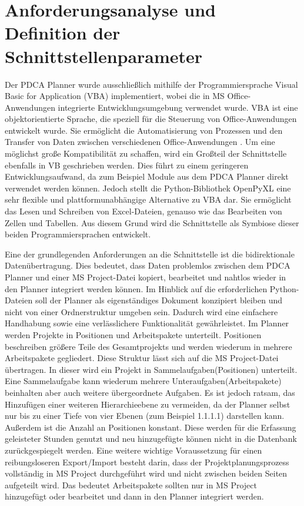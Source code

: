 \documentclass[11pt,a4paper]{report}
\begin{document}
\section{Anforderungsanalyse und Definition der Schnittstellenparameter}

Der PDCA Planner wurde ausschließlich mithilfe der Programmiersprache \glqq Visual Basic for Application \grqq{} (VBA) implementiert, wobei die in MS Office-Anwendungen integrierte  Entwicklungsumgebung verwendet wurde. VBA ist eine objektorientierte Sprache, die speziell für die Steuerung von Office-Anwendungen entwickelt wurde. Sie ermöglicht die Automatisierung von Prozessen und den Transfer von Daten zwischen verschiedenen Office-Anwendungen \cite{Kogan}. Um eine möglichst große Kompatibilität zu schaffen, wird ein Großteil der Schnittstelle ebenfalls in VB geschrieben werden. Dies führt zu  einem geringeren Entwicklungsaufwand, da zum Beispiel Module aus dem PDCA Planner direkt verwendet werden können. Jedoch stellt die Python-Bibliothek \glqq OpenPyXL \grqq{} eine sehr flexible und plattformunabhängige Alternative zu VBA dar. Sie ermöglicht das Lesen und Schreiben von Excel-Dateien, genauso wie das Bearbeiten von Zellen und Tabellen. Aus diesem Grund wird die Schnittstelle als Symbiose dieser beiden Programmiersprachen entwickelt.

\noindent
Eine der grundlegenden Anforderungen an die Schnittstelle ist die bidirektionale Datenübertragung. Dies bedeutet, dass Daten problemlos zwischen dem PDCA Planner und einer MS Project-Datei kopiert, bearbeitet und nahtlos wieder in den Planner integriert werden können. Im Hinblick auf die erforderlichen Python-Dateien soll der Planner als eigenständiges Dokument konzipiert bleiben und nicht von einer Ordnerstruktur umgeben sein. Dadurch wird eine einfachere Handhabung sowie eine verlässlichere Funktionalität gewährleistet. Im Planner werden Projekte in Positionen und Arbeitspakete unterteilt. Positionen beschreiben größere Teile des Gesamtprojekts und werden wiederum in mehrere Arbeitspakete gegliedert. Diese Struktur lässt sich auf die MS Project-Datei übertragen. In dieser wird ein Projekt in Sammelaufgaben(Positionen) unterteilt. Eine Sammelaufgabe kann wiederum mehrere Unteraufgaben(Arbeitspakete) beinhalten aber auch weitere übergeordnete Aufgaben. Es ist jedoch ratsam, das Hinzufügen einer weiteren Hierarchieebene zu vermeiden, da der Planner selbst nur bis zu einer Tiefe von vier Ebenen (zum Beispiel 1.1.1.1) darstellen kann. Außerdem ist die Anzahl an Positionen konstant. Diese werden für die Erfassung geleisteter Stunden genutzt und neu hinzugefügte können nicht in die Datenbank zurückgespiegelt werden. Eine weitere wichtige Voraussetzung für einen reibungsloseren Export/Import besteht darin, dass der Projektplanungsprozess vollständig in MS Project durchgeführt wird und nicht zwischen beiden Seiten aufgeteilt wird. Das bedeutet Arbeitspakete sollten nur in MS Project hinzugefügt oder bearbeitet und dann in den Planner integriert werden.
\end{document}
